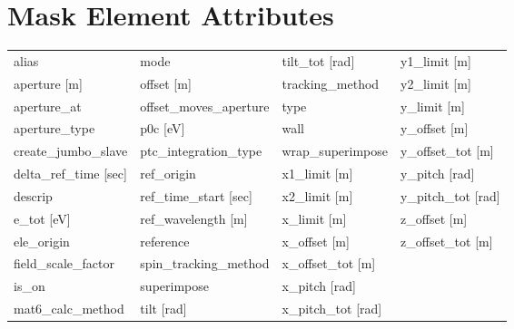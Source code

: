 \section{Mask Element Attributes}
 \label{s:list.mask}
 
 \begin{tabular}{llll} \toprule
alias                            & mode                             & tilt_tot [rad]                   & y1_limit [m]                     \\
aperture [m]                     & offset [m]                       & tracking_method                  & y2_limit [m]                     \\
aperture_at                      & offset_moves_aperture            & type                             & y_limit [m]                      \\
aperture_type                    & p0c [eV]                         & wall                             & y_offset [m]                     \\
create_jumbo_slave               & ptc_integration_type             & wrap_superimpose                 & y_offset_tot [m]                 \\
delta_ref_time [sec]             & ref_origin                       & x1_limit [m]                     & y_pitch [rad]                    \\
descrip                          & ref_time_start [sec]             & x2_limit [m]                     & y_pitch_tot [rad]                \\
e_tot [eV]                       & ref_wavelength [m]               & x_limit [m]                      & z_offset [m]                     \\
ele_origin                       & reference                        & x_offset [m]                     & z_offset_tot [m]                 \\
field_scale_factor               & spin_tracking_method             & x_offset_tot [m]                 &                                  \\
is_on                            & superimpose                      & x_pitch [rad]                    &                                  \\
mat6_calc_method                 & tilt [rad]                       & x_pitch_tot [rad]                &                                  \\
 \bottomrule
 \end{tabular}
 \vfill
 
